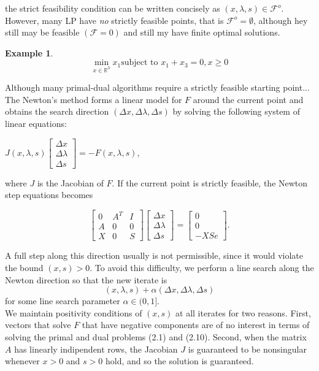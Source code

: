 \documentclass[a4paper,10 pt,titlepage,twoside]{book}
\theoremstyle{plain}
\theoremstyle{definition}
\newtheorem{ex}[thm]{Example}
\theoremstyle{remark}
\begin{document}
the strict feasibility condition can be written concisely as $(x,\lambda,s)\in\mathcal{F}^{o}$.\\
However, many LP have \textit{no} strictly feasible points, that is $\mathcal{F}^{o}=\emptyset$, although hey still may be feasible $(\mathcal{F}=0)$ and still my have finite optimal solutions.
\begin{ex}
	\begin{equation*}
	\min\limits_{x\in\mathbb{R}^{3}} x_{1} \text{subject to }x_{1} + x_{3} = 0, x\geq0
	\end{equation*}
\end{ex}
Although many primal-dual algorithms require a strictly feasible starting point...
The Newton's method forms a linear model for $\mathit{F}$ around the current point and obtains the search direction $(\Delta x,\Delta \lambda,\Delta s)$ by solving the following system of linear equations:
\begin{center}
	$\mathit{J}(x,\lambda,s)\begin{bmatrix}
	\Delta x\\\Delta\lambda \\\Delta s
	\end{bmatrix}=-\mathit{F}(x,\lambda,s)$,
\end{center}
where $\mathit{J}$ is the Jacobian of $\mathit{F}$. If the current point is strictly feasible, the Newton step equations becomes

\begin{equation}\label{(5.1)}
	\begin{bmatrix}
0&A^{T}&I \\A&0&0\\X&0&S
	\end{bmatrix}\begin{bmatrix}
	\Delta x\\\Delta\lambda \\\Delta s
	\end{bmatrix}=\begin{bmatrix}
	0\\0\\-XSe
	\end{bmatrix}.
\end{equation}

A full step along this direction usually is not permissible, since it would violate the bound $(x,s)>0$. To avoid this difficulty, we perform a line search along the Newton direction so that the new iterate is
\begin{equation*}
	(x,\lambda,s) +\alpha (\Delta x,\Delta \lambda,\Delta s)
\end{equation*} 
for some line search parameter $\alpha \in (0,1]$. \\We maintain positivity conditions of $(x,s)$ at all iterates for two reasons. First, vectors that solve $\mathit{F}$ that have negative components are of no interest in terms of solving the primal and dual problems (2.1) and (2.10). Second, when the matrix $A$ has linearly indipendent rows, the Jacobian $J$ is guaranteed to be nonsingular whenever $x>0$ and $s>0$ hold, and so the solution is guaranteed.
\end{document}
